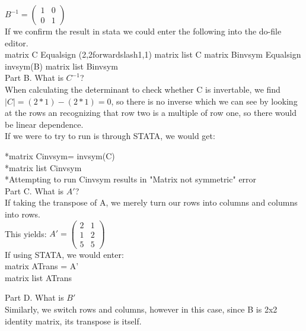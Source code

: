 \documentclass{article}
\begin{document}
$B^{-1}=\left( \begin{smallmatrix} 1&0\\0&1 \end{smallmatrix} \right)$\\

If we confirm the result in stata we could enter the following into the do-file editor.\\

matrix C Equalsign (2,2forwardslash1,1)
matrix list C
matrix Binvsym Equalsign invsym(B)
matrix list Binvsym\\

Part B. What is $C^{-1}$?  \\

When calculating the determinant to check whether C is invertable, we find $|C|= (2*1)-(2*1)=0$, so there is no inverse which we can see by looking at the rows an recognizing that row two is a multiple of row one, so there would be linear dependence.\\

If we were to try to run is through STATA, we would get:

*matrix Cinvsym= invsym(C)\\
*matrix list Cinvsym\\
*Attempting to run Cinvsym results in "Matrix not symmetric" error \\

Part C. What is $A'$?\\

If taking the transpose of A, we merely turn our rows into columns and columns into rows.\\

This yields: $A' = \left( \begin{smallmatrix} 2&1\\1&2\\5&5 \end{smallmatrix} \right)$\\

If using STATA, we would enter:\\

matrix ATrans = A'\\
matrix list ATrans

Part D. What is $B'$\\

Similarly, we switch rows and columns, however in this case, since B is 2x2 identity matrix, its transpose is itself.\\
\end{document}
